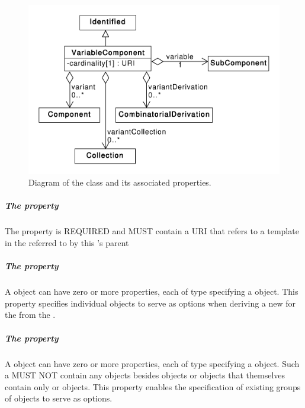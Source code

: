 \begin{figure}[ht]
\begin{center}
\includegraphics[scale=0.6]{uml/variable_component}
\caption[]{Diagram of the  class and its associated properties.}
\label{uml:variable_component}
\end{center}
\end{figure}

\subparagraph{The  property}\label{sec:variable}

The  property is REQUIRED and MUST contain a URI that refers to a template  in the   referred to by this 's parent 

\subparagraph{The  property}\label{sec:variant}

A  object can have zero or more  properties, each of type  specifying a  object. This property specifies individual  objects to serve as options when deriving a new
 for the   from the .

\subparagraph{The  property}\label{sec:variantCollection}

A  object can have zero or more  properties, each of type  specifying a  object.
Such a  MUST NOT contain any objects besides  objects or  objects that themselves contain only  or  objects.
This property enables the specification of existing groups of  objects to serve as options.

